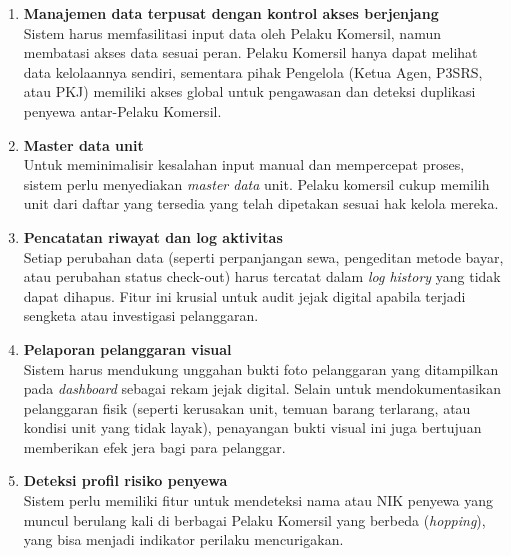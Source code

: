 \begin{enumerate}
    \item \textbf{Manajemen data terpusat dengan kontrol akses berjenjang}\\
    Sistem harus memfasilitasi input data oleh Pelaku Komersil, namun membatasi akses data sesuai peran. Pelaku Komersil hanya dapat melihat data kelolaannya sendiri, sementara pihak Pengelola (Ketua Agen, P3SRS, atau PKJ) memiliki akses global untuk pengawasan dan deteksi duplikasi penyewa antar-Pelaku Komersil.
    
    \item \textbf{Master data unit}\\
    Untuk meminimalisir kesalahan input manual dan mempercepat proses, sistem perlu menyediakan \textit{master data} unit. Pelaku komersil cukup memilih unit dari daftar yang tersedia yang telah dipetakan sesuai hak kelola mereka.
    
    \item \textbf{Pencatatan riwayat dan log aktivitas}\\
    Setiap perubahan data (seperti perpanjangan sewa, pengeditan metode bayar, atau perubahan status check-out) harus tercatat dalam \textit{log history} yang tidak dapat dihapus. Fitur ini krusial untuk audit jejak digital apabila terjadi sengketa atau investigasi pelanggaran.
    
    \item \textbf{Pelaporan pelanggaran visual}\\
    Sistem harus mendukung unggahan bukti foto pelanggaran yang ditampilkan pada \textit{dashboard} sebagai rekam jejak digital. Selain untuk mendokumentasikan pelanggaran fisik (seperti kerusakan unit, temuan barang terlarang, atau kondisi unit yang tidak layak), penayangan bukti visual ini juga bertujuan memberikan efek jera bagi para pelanggar.
    
    \item \textbf{Deteksi profil risiko penyewa}\\
    Sistem perlu memiliki fitur untuk mendeteksi nama atau NIK penyewa yang muncul berulang kali di berbagai Pelaku Komersil yang berbeda (\textit{hopping}), yang bisa menjadi indikator perilaku mencurigakan.
\end{enumerate}


